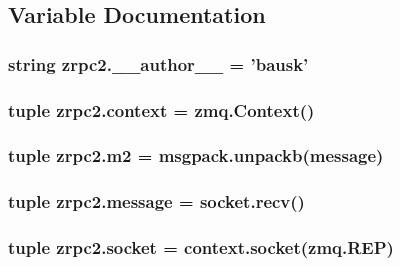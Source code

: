 \subsection{Variable Documentation}
\hypertarget{namespacezrpc2_ab6eb50c4b8d874520e4089b273b63e16}{
\subsubsection[{\+\_\+\+\_\+author\+\_\+\+\_\+}]{\setlength{\rightskip}{0pt plus 5cm}string zrpc2.\+\_\+\+\_\+author\+\_\+\+\_\+ = 'bausk'}}\label{namespacezrpc2_ab6eb50c4b8d874520e4089b273b63e16}
\hypertarget{namespacezrpc2_aad77b0202c8bdc01b68d63c381d5bb4b}{
\subsubsection[{context}]{\setlength{\rightskip}{0pt plus 5cm}tuple zrpc2.\+context = zmq.\+Context()}}\label{namespacezrpc2_aad77b0202c8bdc01b68d63c381d5bb4b}
\hypertarget{namespacezrpc2_a55892ab0cec9d46ce8b2a50f92998e57}{
\subsubsection[{m2}]{\setlength{\rightskip}{0pt plus 5cm}tuple zrpc2.\+m2 = msgpack.\+unpackb({\bf message})}}\label{namespacezrpc2_a55892ab0cec9d46ce8b2a50f92998e57}
\hypertarget{namespacezrpc2_a3a2870282951b1ba168443ba71d13079}{
\subsubsection[{message}]{\setlength{\rightskip}{0pt plus 5cm}tuple zrpc2.\+message = socket.\+recv()}}\label{namespacezrpc2_a3a2870282951b1ba168443ba71d13079}
\hypertarget{namespacezrpc2_a5cc44b717d0374316398080bedecec05}{
\subsubsection[{socket}]{\setlength{\rightskip}{0pt plus 5cm}tuple zrpc2.\+socket = context.\+socket(zmq.\+R\+E\+P)}}\label{namespacezrpc2_a5cc44b717d0374316398080bedecec05}
